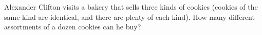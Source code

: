 Alexander Clifton visits a bakery that sells three kinds of cookies (cookies of the same kind are identical, and there are plenty of each kind). How many different assortments of a dozen cookies can he buy?
